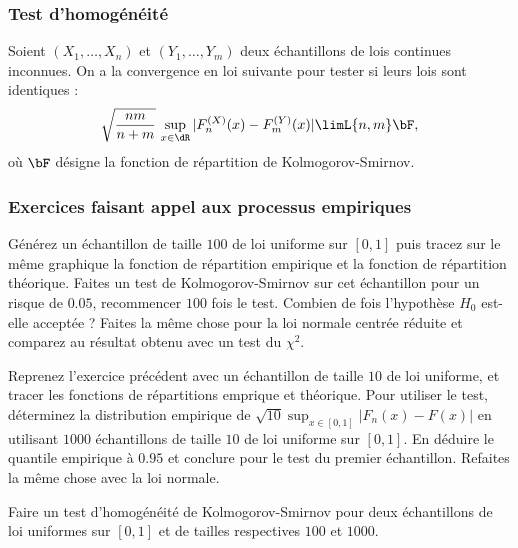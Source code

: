 \subsubsection{Test d'homogénéité}

Soient $(X_1,\ldots,X_n)$ et $(Y_1,\ldots,Y_m)$ deux échantillons de lois continues
inconnues. On a la convergence en loi suivante pour tester si leurs lois sont
identiques :
$$
\sqrt{\frac{nm}{n+m}}
\,
\sup_{x \in \dR}|F_n^{(X)}(x)-F_m^{(Y)}(x)|
\limL{n,m} 
\bF,
$$
où $\bF$ désigne la fonction de répartition de Kolmogorov-Smirnov.

\subsubsection{Exercices faisant appel aux processus empiriques}

\begin{exo}
  Générez un échantillon de taille $100$ de loi uniforme sur $[0,1]$ puis
  tracez sur le même graphique la fonction de répartition empirique et la
  fonction de répartition théorique. Faites un test de Kolmogorov-Smirnov sur
  cet échantillon pour un risque de $0.05$, recommencer $100$ fois le test.
  Combien de fois l'hypothèse $H_0$ est-elle acceptée ? Faites la même chose
  pour la loi normale centrée réduite et comparez au résultat obtenu avec
  un test du $\chi^2$.
\end{exo}

\begin{exo}
  Reprenez l'exercice précédent avec un échantillon de taille $10$ de loi
  uniforme, et tracer les fonctions de répartitions emprique et théorique.
  Pour utiliser le test, déterminez la distribution empirique de
  $\sqrt{10}\sup _{x \in [0,1]} |F_n(x)-F(x)|$ en utilisant $1000$
  échantillons de taille $10$ de loi uniforme sur $[0,1]$. En déduire le
  quantile empirique à $0.95$ et conclure pour le test du premier échantillon.
  Refaites la même chose avec la loi normale.
\end{exo}

\begin{exo}
  Faire un test d'homogénéité de Kolmogorov-Smirnov pour deux échantillons de
  loi uniformes sur $[0,1]$ et de tailles respectives $100$ et $1000$.
\end{exo}

